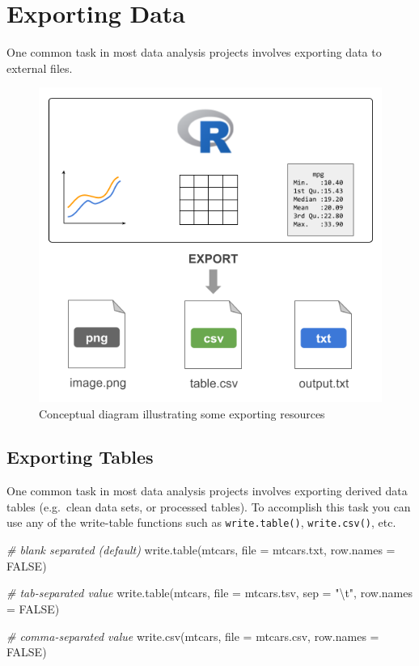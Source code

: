 \documentclass[
]{book}
\newenvironment{Shaded}{\begin{snugshade}}{\end{snugshade}}
\newcommand{\AttributeTok}[1]{\textcolor[rgb]{0.77,0.63,0.00}{#1}}
\newcommand{\CommentTok}[1]{\textcolor[rgb]{0.56,0.35,0.01}{\textit{#1}}}
\newcommand{\ConstantTok}[1]{\textcolor[rgb]{0.00,0.00,0.00}{#1}}
\newcommand{\FunctionTok}[1]{\textcolor[rgb]{0.00,0.00,0.00}{#1}}
\newcommand{\NormalTok}[1]{#1}
\newcommand{\SpecialCharTok}[1]{\textcolor[rgb]{0.00,0.00,0.00}{#1}}
\newcommand{\StringTok}[1]{\textcolor[rgb]{0.31,0.60,0.02}{#1}}
\begin{document}
\hypertarget{export-data}{%
\chapter{Exporting Data}\label{export-data}}

One common task in most data analysis projects involves exporting data to
external files.

\begin{figure}

{\centering \includegraphics[width=0.6\linewidth]{images/inout/export-resources} 

}

\caption{Conceptual diagram illustrating some exporting resources}\label{fig:unnamed-chunk-381}
\end{figure}

\hypertarget{exporting-tables}{%
\section{Exporting Tables}\label{exporting-tables}}

One common task in most data analysis projects involves exporting derived
data tables (e.g.~clean data sets, or processed tables). To accomplish this
task you can use any of the write-table functions such as \texttt{write.table()},
\texttt{write.csv()}, etc.

\begin{Shaded}
\begin{Highlighting}[]
\CommentTok{\# blank separated (default)}
\FunctionTok{write.table}\NormalTok{(mtcars, }\AttributeTok{file =} \StringTok{\textquotesingle{}mtcars.txt\textquotesingle{}}\NormalTok{, }\AttributeTok{row.names =} \ConstantTok{FALSE}\NormalTok{)}

\CommentTok{\# tab{-}separated value}
\FunctionTok{write.table}\NormalTok{(mtcars, }\AttributeTok{file =} \StringTok{\textquotesingle{}mtcars.tsv\textquotesingle{}}\NormalTok{, }\AttributeTok{sep =} \StringTok{"}\SpecialCharTok{\textbackslash{}t}\StringTok{"}\NormalTok{, }\AttributeTok{row.names =} \ConstantTok{FALSE}\NormalTok{)}

\CommentTok{\# comma{-}separated value}
\FunctionTok{write.csv}\NormalTok{(mtcars, }\AttributeTok{file =} \StringTok{\textquotesingle{}mtcars.csv\textquotesingle{}}\NormalTok{, }\AttributeTok{row.names =} \ConstantTok{FALSE}\NormalTok{)}
\end{Highlighting}
\end{Shaded}
\end{document}
